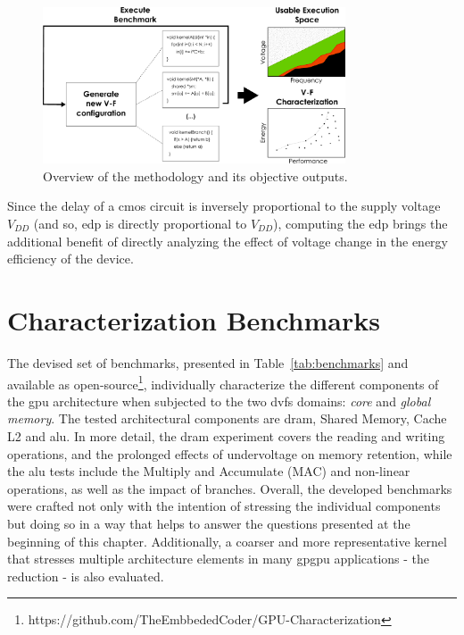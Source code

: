 \begin{figure}[htb]
  \centering
  \includegraphics[width=0.8\textwidth]{Figures/GPU_characterization/gpu_char.pdf}
  \caption{Overview of the methodology and its objective outputs.}
  \label{fig:gpu_char}
\end{figure}

Since the delay of a \acrshort{cmos} circuit is inversely proportional to the supply voltage $V_{DD}$ (and so, \acrshort{edp} is directly proportional to $V_{DD}$), computing the \acrshort{edp} brings the additional benefit of directly analyzing the effect of voltage change in the energy efficiency of the device.


\section{Characterization Benchmarks}
\label{sec:char_meth}

The devised set of benchmarks,  presented in Table~\ref{tab:benchmarks} and available as open-source\footnote{https://github.com/TheEmbbededCoder/GPU-Characterization}, individually characterize the different components of the \acrshort{gpu} architecture when subjected to the two \acrshort{dvfs} domains: \textit{core} and \textit{global memory}. The tested architectural components are \acrshort{dram}, Shared Memory, Cache L2 and \acrshort{alu}. In more detail, the \acrshort{dram} experiment covers the reading and writing operations, and the prolonged effects of undervoltage on memory retention, while the \acrshort{alu} tests include the Multiply and Accumulate (MAC) and non-linear operations, as well as the impact of branches. Overall, the developed benchmarks were crafted not only with the intention of stressing the individual components but doing so in a way that helps to answer the questions presented at the beginning of this chapter. Additionally, a coarser and more representative kernel that stresses multiple architecture elements in many \acrshort{gpgpu} applications - the reduction - is also evaluated.


